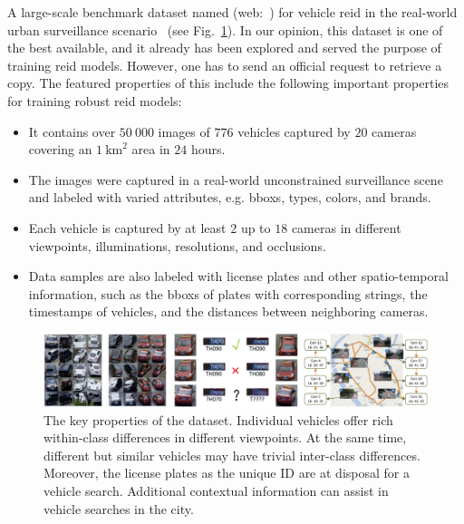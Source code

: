 A large-scale benchmark dataset named \verisss{} (web:~\cite{webveridataset}) for vehicle \gls{reid} in the real-world urban surveillance scenario~\cite{liu2018provid} (see Fig.~\ref{fig:VeRI776Dataset}). In our opinion, this dataset is one of the best available, and it already has been explored and served the purpose of training \gls{reid} models. However, one has to send an official request to retrieve a copy. The featured properties of this include the following important properties for training robust \gls{reid} models:

\begin{itemize}
    \item It contains over $50\ 000$ images of $776$ vehicles captured by $20$ cameras covering an $1\  \text{km}^2$ area in $24$ hours.
    \item The images were captured in a real-world unconstrained surveillance scene and labeled with varied attributes, e.g. \glspl{bbox}, types, colors, and brands.
    \item Each vehicle is captured by at least $2$ up to $18$ cameras in different viewpoints, illuminations, resolutions, and occlusions.
    \item Data samples are also labeled with license plates and other spatio-temporal information, such as the \glspl{bbox} of plates with corresponding strings, the timestamps of vehicles, and the distances between neighboring cameras.
\end{itemize}

\begin{figure}[t]
    \centerline{\includegraphics[width=\linewidth]{figures/datasets/veri776__overview.pdf}}
    \caption[\verisss{} dataset]{The key properties of the \verisss{} dataset. Individual vehicles offer rich within-class differences in different viewpoints. At the same time, different but similar vehicles may have trivial inter-class differences. Moreover, the license plates as the unique ID are at disposal for a vehicle search. Additional contextual information can assist in vehicle searches in the city. }
    \label{fig:VeRI776Dataset}
\end{figure}
